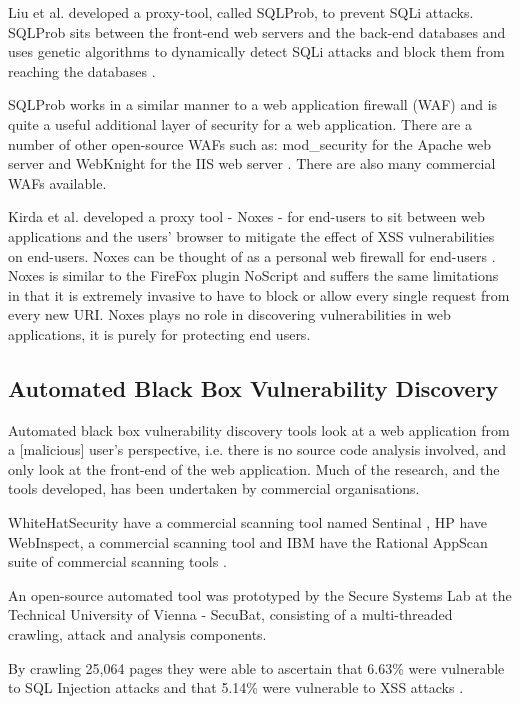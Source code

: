 \documentclass[12pt,a4paper]{article}
\begin{document}
Liu et al. developed  a proxy-tool, called SQLProb, to prevent SQLi attacks.  SQLProb sits between the front-end web servers and the back-end databases and uses genetic algorithms to dynamically detect SQLi attacks and block them from reaching the databases \cite{Liu2009}.

SQLProb works in a similar manner to a web application firewall (WAF) and is quite a useful additional layer of security for a web application.  There are a number of other open-source WAFs such as: mod\_security for the Apache web server \cite{ModSecurity:2010:Online} and WebKnight for the IIS web server \cite{WebKnight:2010:Online}.  There are also many commercial WAFs available.

Kirda et al. developed a proxy tool - Noxes - for end-users to sit between  web applications and the users’ browser to mitigate the effect of XSS vulnerabilities on end-users.  Noxes can be thought of as a personal web firewall for end-users \cite{Kirda2006}. Noxes is similar to the FireFox plugin NoScript \cite{NoScript:2010:Online} and suffers the same limitations in that it is extremely invasive to have to block or allow every single request from every new URI.  Noxes plays no role in discovering vulnerabilities in web applications, it is purely for protecting end users.

\subsection{Automated Black Box Vulnerability Discovery}
Automated black box vulnerability discovery tools look at a web application from a [malicious] user’s perspective, i.e. there is no source code analysis involved, and only look at the front-end of the web application.  Much of the research, and the tools developed, has been undertaken by commercial organisations.

WhiteHatSecurity have a commercial scanning tool named Sentinal \cite{WhiteHatSecurity:2010:Online}, HP have WebInspect, a commercial scanning tool \cite{HPWebInspect:2010:Online} and IBM have the Rational AppScan suite of commercial scanning tools \cite{IBM:2010:Online}. 

An open-source automated tool was prototyped by the Secure Systems Lab at the Technical University of Vienna - SecuBat, consisting of a multi-threaded crawling, attack and analysis components.   

By crawling 25,064 pages they were able to ascertain that 6.63\% were vulnerable to SQL Injection attacks and that 5.14\% were vulnerable to XSS attacks \cite{Kals2006}.
\end{document}
